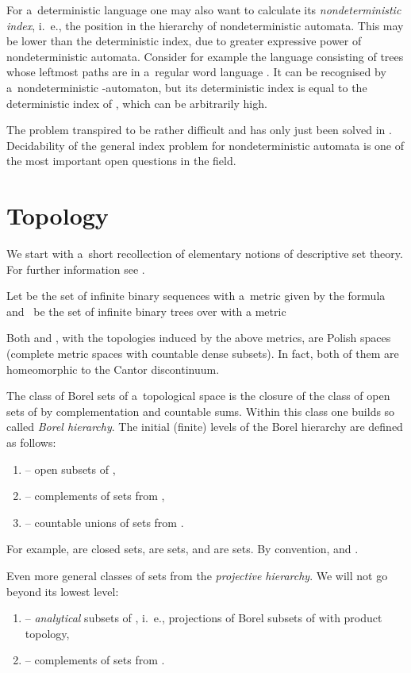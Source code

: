 \documentclass{LMCS}
\begin{document}
For a~deterministic language one may also want to calculate its {\em nondeterministic index},  i.~e., the position in the hierarchy of nondeterministic automata. This may be lower than the deterministic index, due to greater expressive power of nondeterministic automata. Consider for example the language  consisting of trees whose leftmost paths are in a~regular word language . It can be recognised by a~nondeterministic -automaton, but its deterministic index is equal to the deterministic index of , which can be arbitrarily high.

The problem transpired to be rather difficult and has only just been solved in \cite{hie}. Decidability of the general index problem for nondeterministic automata is one of the most important open questions in the field.


\section{Topology}\label{sect:topology}

We start with a~short recollection of elementary notions of descriptive set theory. For further information see \cite{kechris}.

Let  be the set of infinite binary sequences with a~metric given by the formula 
 and~ be the set of infinite binary trees over  with a metric

Both  and , with the topologies induced by the above metrics, are Polish spaces  (complete  metric spaces with countable dense subsets). In fact, both of them are homeomorphic to the Cantor discontinuum. 

The class of Borel sets of a~topological space  is the closure of the class of open sets of  by complementation and countable sums. Within this class one builds so called {\em Borel hierarchy}. The initial (finite) levels of the Borel hierarchy are defined as follows:
\begin{enumerate}[]
  \item  --  open subsets of ,
  \item  --  complements of sets from , 
  \item  --  countable unions of sets from .
\end{enumerate}
For example,  are closed sets,  are  sets, and  are  sets. By convention,  and .

Even more general classes of sets from the {\em projective hierarchy}.  We will not go beyond its lowest level:
\begin{enumerate}[]
  \item  --  {\em analytical} subsets of , i.~e., projections of Borel subsets of  with product topology,
  \item  --  complements of sets from .
\end{enumerate}
\end{document}
